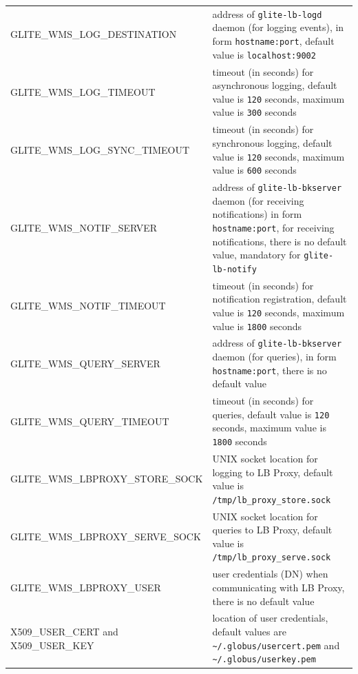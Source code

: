 \begin{tabularx}{\textwidth}{lX}
GLITE\_WMS\_LOG\_DESTINATION & 
   address of \verb'glite-lb-logd' daemon (for logging events), 
   in form \verb'hostname:port',
   default value is \verb'localhost:9002'\\
GLITE\_WMS\_LOG\_TIMEOUT & 
   timeout (in seconds) for asynchronous logging, 
   default value is \verb'120' seconds, 
   maximum value is \verb'300' seconds \\
GLITE\_WMS\_LOG\_SYNC\_TIMEOUT & 
   timeout (in seconds) for synchronous logging, 
   default value is \verb'120' seconds, 
   maximum value is \verb'600' seconds \\
GLITE\_WMS\_NOTIF\_SERVER & 
   address of \verb'glite-lb-bkserver' daemon (for receiving notifications)
   in form \verb'hostname:port', for receiving notifications,
   there is no default value,
   mandatory for \verb'glite-lb-notify' \\
GLITE\_WMS\_NOTIF\_TIMEOUT & 
   timeout (in seconds) for notification registration,
   default value is \verb'120' seconds,
   maximum value is \verb'1800' seconds \\
GLITE\_WMS\_QUERY\_SERVER & 
   address of \verb'glite-lb-bkserver' daemon (for queries), 
   in form \verb'hostname:port', 
   there is no default value \\
GLITE\_WMS\_QUERY\_TIMEOUT &
   timeout (in seconds) for queries,
   default value is \verb'120' seconds,
   maximum value is \verb'1800' seconds \\
GLITE\_WMS\_LBPROXY\_STORE\_SOCK &
   UNIX socket location for logging to LB Proxy,
   default value is \verb'/tmp/lb_proxy_store.sock' \\
GLITE\_WMS\_LBPROXY\_SERVE\_SOCK &
   UNIX socket location for queries to LB Proxy,
   default value is \verb'/tmp/lb_proxy_serve.sock' \\
GLITE\_WMS\_LBPROXY\_USER &
   user credentials (DN) when communicating with LB Proxy,  
   there is no default value \\
X509\_USER\_CERT and X509\_USER\_KEY & 
   location of user credentials,
   default values are \verb'~/.globus/usercert.pem' and \verb'~/.globus/userkey.pem' \\

\end{tabularx}
